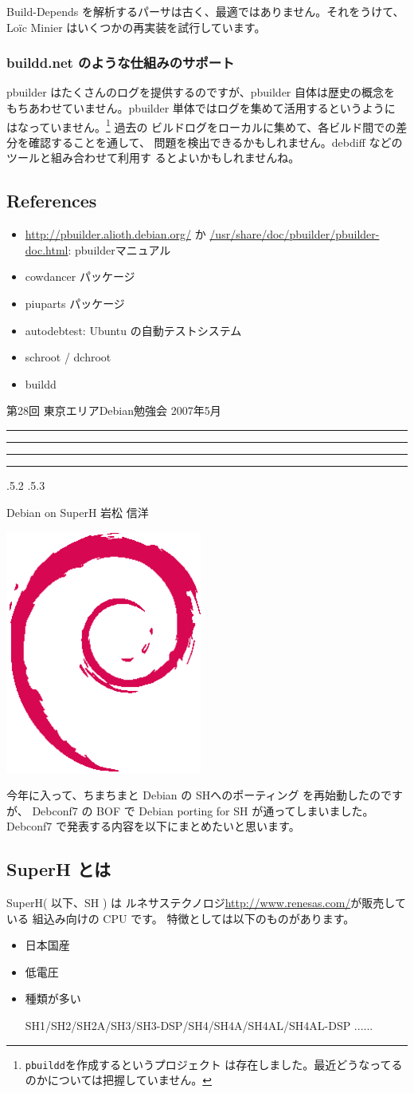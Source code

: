 \documentclass[mingoth,a4paper]{jsarticle}
\makeatletter
\newcommand{\debmtgyear}{2007}
\newcommand{\debmtgmonth}{5}
\newcommand{\debmtgnumber}{28}
\renewcommand{\section}{\@startsection{section}{1}{\z@}%
    {\Cvs \@plus.5\Cdp \@minus.2\Cdp}%
    {.5\Cvs \@plus.3\Cdp}%
    {\normalfont\gt\fontsize{26}{26}\headfont\raggedright}} %
\newcommand{\dancersection}[2]{%
\newpage
第\debmtgnumber{}回 東京エリアDebian勉強会 \debmtgyear{}年\debmtgmonth{}月
\hrule
\vspace{0.5mm}
\hrule
%
\vspace{4cm}
\hrule
\vspace{0.5mm}
\hrule
%
\vspace{-7cm}
\begin{minipage}[b]{0.7\hsize}
\section{#1}
\hfill{}#2\\
\vspace{2cm}
\end{minipage}
\begin{minipage}[b]{0.3\hsize}
\hfill{}\includegraphics[height=8cm]{image200502/openlogo-nd.eps}\\
\end{minipage}
%
\vspace{-1cm}
}
\makeatother
\begin{document}
Build-Depends を解析するパーサは古く、最適ではありません。それをうけて、
Lo\"ic Minier はいくつかの再実装を試行しています。

\subsubsection{buildd.net のような仕組みのサポート}

pbuilder はたくさんのログを提供するのですが、pbuilder 自体は歴史の概念を
もちあわせていません。pbuilder 単体ではログを集めて活用するというように
はなっていません。\footnote{\texttt{pbuildd}を作成するというプロジェクト
は存在しました。最近どうなってるのかについては把握していません。} 過去の
ビルドログをローカルに集めて、各ビルド間での差分を確認することを通して、
問題を検出できるかもしれません。debdiff などのツールと組み合わせて利用す
るとよいかもしれませんね。


\subsection{References}

\begin{itemize}
 \item \url{http://pbuilder.alioth.debian.org/} か
 \url{/usr/share/doc/pbuilder/pbuilder-doc.html}: pbuilderマニュアル
 \item cowdancer パッケージ
 \item piuparts パッケージ
 \item autodebtest: Ubuntu の自動テストシステム
 \item schroot / dchroot 
 \item buildd
\end{itemize}

\dancersection{Debian on SuperH}{岩松 信洋}
\label{debiansuperh}

今年に入って、ちまちまと Debian の SHへのポーティング を再始動したのですが、
Debconf7 の BOF で Debian porting for SH が通ってしまいました。
Debconf7 で発表する内容を以下にまとめたいと思います。

\subsection{SuperH とは}

SuperH( 以下、SH ) は ルネサステクノロジ\url{http://www.renesas.com/}が販売している 組込み向けの CPU です。
特徴としては以下のものがあります。
\begin{itemize}
	\item 日本国産
	\item 低電圧
	\item 種類が多い

		SH1/SH2/SH2A/SH3/SH3-DSP/SH4/SH4A/SH4AL/SH4AL-DSP ......
\end{itemize}
\end{document}

